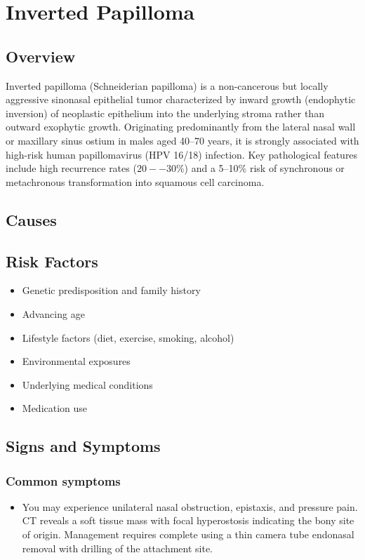 \chapter{Inverted Papilloma}
\label{sec:Inverted Papilloma}

\section{Overview}
Inverted papilloma (Schneiderian papilloma) is a non-cancerous but locally aggressive sinonasal epithelial tumor characterized by inward growth (endophytic inversion) of neoplastic epithelium into the underlying stroma rather than outward exophytic growth. Originating predominantly from the lateral nasal wall or maxillary sinus ostium in males aged 40--70 years, it is strongly associated with high-risk human papillomavirus (HPV 16/18) infection. Key pathological features include high recurrence rates ($20--30\%$) and a 5--10\% risk of synchronous or metachronous transformation into squamous cell carcinoma.
\section{Causes}
\section{Risk Factors}

\begin{itemize}[noitemsep]
  \item Genetic predisposition and family history
  \item Advancing age
  \item Lifestyle factors (diet, exercise, smoking, alcohol)
  \item Environmental exposures
  \item Underlying medical conditions
  \item Medication use
\end{itemize}
\section{Signs and Symptoms}

\subsection{Common symptoms}
\begin{itemize}[noitemsep]
  \item You may experience unilateral nasal obstruction, epistaxis, and pressure pain. CT reveals a soft tissue mass with focal hyperostosis indicating the bony site of origin. Management requires complete using a thin camera tube endonasal removal with drilling of the attachment site. 
  \end{itemize}

